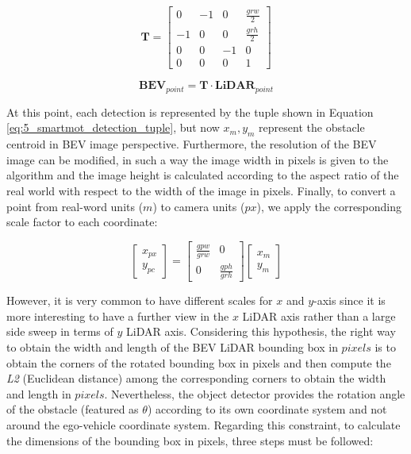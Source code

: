 \begin{equation}
	\label{eq:5_smartmot_rw_to_image_transform}
	\textbf{T} = \left[ \begin{array}{cccc}
		0  &  -1 &  0  &  \frac{grw}{2} \\
		-1 &  0  &  0  &  \frac{grh}{2} \\
		0  &  0  &  -1 &  0            \\
		0  &  0  &  0  &  1 \end{array} \right] 
\end{equation}

\begin{equation}
	\label{eq:5_smartmot_rw_to_image_apply_transform}
	\textbf{BEV}_{point} = \textbf{T} \cdot \textbf{LiDAR}_{point}
\end{equation}

At this point, each detection is represented by the tuple shown in Equation \ref{eq:5_smartmot_detection_tuple}, but now \textit{$x_{m},y_{m}$} represent the obstacle centroid in \ac{BEV} image perspective. Furthermore, the resolution of the \ac{BEV} image can be modified, in such a way the image width in pixels is given to the algorithm and the image height is calculated according to the aspect ratio of the real world with respect to the width of the image in pixels. Finally, to convert a point from real-word units ($\textit{m}$) to camera units ($\textit{px}$), we apply the corresponding scale factor to each coordinate:

\begin{equation}
	\label{conversion}
	\left[ \begin{array}{c}
		x_{px}  \\
		y_{pc} \end{array} \right] 
	=
	\left[ \begin{array}{cc}
		\frac{gpw}{grw} & 0  \\
		0 & \frac{gph}{grh} \end{array} \right]
	\left[ \begin{array}{c}
		x_{m}  \\
		y_{m} \end{array} \right] 
\end{equation}

However, it is very common to have different scales for $\textit{x}$ and $\textit{y}$-axis since it is more interesting to have a further view in the $\textit{x}$ LiDAR axis rather than a large side sweep in terms of $\textit{y}$ LiDAR axis. Considering this hypothesis, the right way to obtain the width and length of the \ac{BEV} LiDAR bounding box in $\textit{pixels}$ is to obtain the corners of the rotated bounding box in pixels and then compute the \textit{L2} (\aka Euclidean distance) among the corresponding corners to obtain the width and length in $\textit{pixels}$. Nevertheless, the object detector provides the rotation angle of the obstacle (featured as $\theta$) according to its own coordinate system and not around the ego-vehicle coordinate system. Regarding this constraint, to calculate the dimensions of the bounding box in pixels, three steps must be followed:

